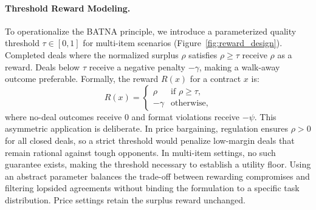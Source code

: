 \documentclass[11pt]{article}
\begin{document}

\paragraph{Threshold Reward Modeling.} To operationalize the BATNA principle, we introduce a parameterized quality threshold $\tau \in [0, 1]$ for multi-item scenarios (Figure~\ref{fig:reward_design}). Completed deals where the normalized surplus $\rho$ satisfies $\rho \geq \tau$ receive $\rho$ as a reward. Deals below $\tau$ receive a negative penalty $-\gamma$, making a walk-away outcome preferable. Formally, the reward $R(x)$ for a contract $x$ is:
\[
R(x) = \begin{cases} 
\rho & \text{if } \rho \geq \tau, \\ 
-\gamma & \text{otherwise,} 
\end{cases}
\]
where no-deal outcomes receive $0$ and format violations receive $-\psi$. This asymmetric application is deliberate. In price bargaining, regulation ensures $\rho > 0$ for all closed deals, so a strict threshold would penalize low-margin deals that remain rational against tough opponents. In multi-item settings, no such guarantee exists, making the threshold necessary to establish a utility floor. Using an abstract parameter balances the trade-off between rewarding compromises and filtering lopsided agreements without binding the formulation to a specific task distribution. Price settings retain the surplus reward unchanged.
\end{document}
